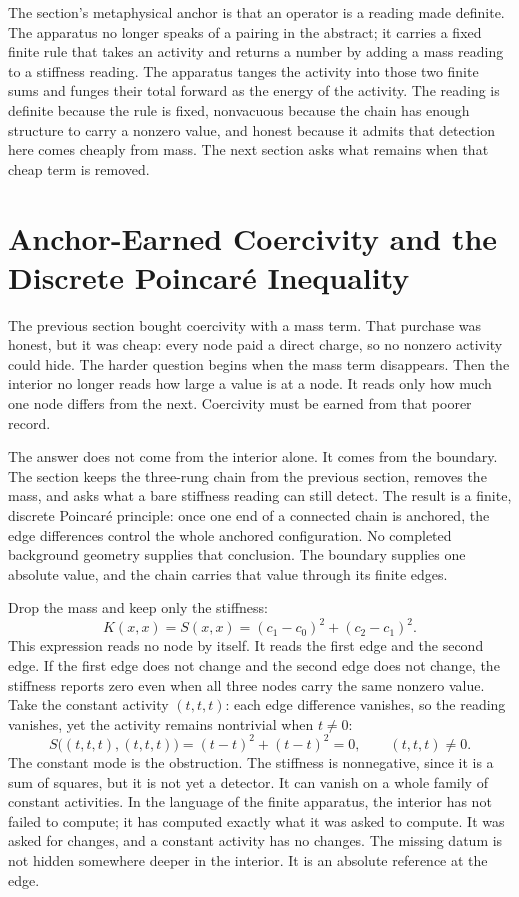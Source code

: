 The section's metaphysical anchor is that an operator is a reading made definite.
The apparatus no longer speaks of a pairing in the abstract; it carries a fixed
finite rule that takes an activity and returns a number by adding a mass reading
to a stiffness reading. The apparatus tanges the activity into those two finite
sums and funges their total forward as the energy of the activity. The reading is
definite because the rule is fixed, nonvacuous because the chain has enough
structure to carry a nonzero value, and honest because it admits that detection
here comes cheaply from mass. The next section asks what remains when that cheap
term is removed.

\section{Anchor-Earned Coercivity and the Discrete Poincaré Inequality}

The previous section bought coercivity with a mass term. That purchase was
honest, but it was cheap: every node paid a direct charge, so no nonzero
activity could hide. The harder question begins when the mass term disappears.
Then the interior no longer reads how large a value is at a node. It reads only
how much one node differs from the next. Coercivity must be earned from that
poorer record.

The answer does not come from the interior alone. It comes from the boundary.
The section keeps the three-rung chain from the previous section, removes the
mass, and asks what a bare stiffness reading can still detect. The result is a
finite, discrete Poincaré principle: once one end of a connected chain is
anchored, the edge differences control the whole anchored configuration. No
completed background geometry supplies that conclusion. The boundary supplies
one absolute value, and the chain carries that value through its finite edges.

Drop the mass and keep only the stiffness:
\[
  K(x,x) = S(x,x) = (c_1 - c_0)^{2} + (c_2 - c_1)^{2}.
\]
This expression reads no node by itself. It reads the first edge and the second
edge. If the first edge does not change and the second edge does not change, the
stiffness reports zero even when all three nodes carry the same nonzero value.
Take the constant activity \((t,t,t)\): each edge difference vanishes, so the
reading vanishes, yet the activity remains nontrivial when \(t \neq 0\):
\[
  S\big((t,t,t),(t,t,t)\big)
  = (t-t)^2 + (t-t)^2 = 0,
  \qquad (t,t,t) \neq 0.
\]
The constant mode is the obstruction. The stiffness is nonnegative, since it is
a sum of squares, but it is not yet a detector. It can vanish on a whole family
of constant activities. In the language of the finite apparatus, the interior
has not failed to compute; it has computed exactly what it was asked to compute.
It was asked for changes, and a constant activity has no changes. The missing
datum is not hidden somewhere deeper in the interior. It is an absolute
reference at the edge.

